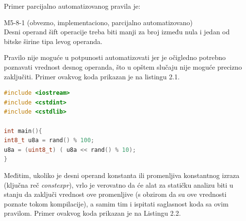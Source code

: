 \documentclass[12pt,oneside]{memoir}
\begin{document}
\begin{itemize}
{Primer parcijalno automatizovanog pravila je: 

\begin{center}

\begin{tcolorbox}
 M5-8-1 (obvezno, implementaciono, parcijalno automatizovano) \\
Desni operand šift operacije treba biti manji za broj između nula i jedan
od bitske širine tipa levog operanda.

\end{tcolorbox}
\end{center}

  Pravilo nije moguće u potpunosti automatizovati jer je očigledno potrebno poznavati vrednost desnog operanda, što u opštem slučaju nije
  moguće precizno zaključiti. Primer ovakvog koda prikazan je na listingu 2.1. 
\begin{english}



\begin{lstlisting}[caption={K\^{o}d koji ilustruje nemogućnost primene statičke analize},label={lst:label},language=C++, captionpos=b]
#include <iostream>
#include <cstdint>
#include <cstdlib>

int main(){
int8_t u8a = rand() % 100;
u8a = (uint8_t) ( u8a << rand() % 10);
}
\end{lstlisting}
\end{english}
Međitim, ukoliko je desni operand konstanta ili promenljiva konstantnog izraza (klju\v{c}na re\v{c} \textit{constexpr}), vrlo je verovatno da će alat za statičku analizu biti u stanju
  da zaključi vrednost ove promenljive (s obzirom da su ove vrednosti poznate tokom kompilacije), a samim tim i ispitati saglasnost koda sa ovim pravilom.
  Primer ovakvog koda prikazan je na Listingu 2.2.
\begin{english}




\end{english}}
\end{itemize}
\end{document}
